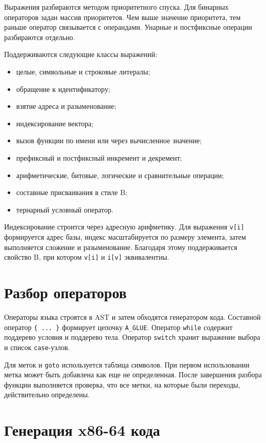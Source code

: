 Выражения разбираются методом приоритетного спуска. Для бинарных операторов задан массив приоритетов. Чем выше значение приоритета, тем раньше оператор связывается с операндами. Унарные и постфиксные операции разбираются отдельно.

Поддерживаются следующие классы выражений:

\begin{itemize}
  \item целые, символьные и строковые литералы;
  \item обращение к идентификатору;
  \item взятие адреса и разыменование;
  \item индексирование вектора;
  \item вызов функции по имени или через вычисленное значение;
  \item префиксный и постфиксный инкремент и декремент;
  \item арифметические, битовые, логические и сравнительные операции;
  \item составные присваивания в стиле B;
  \item тернарный условный оператор.
\end{itemize}

Индексирование строится через адресную арифметику. Для выражения \texttt{v[i]} формируется адрес базы, индекс масштабируется по размеру элемента, затем выполняется сложение и разыменование. Благодаря этому поддерживается свойство B, при котором \texttt{v[i]} и \texttt{i[v]} эквивалентны.

\section{Разбор операторов}

Операторы языка строятся в AST и затем обходятся генератором кода. Составной оператор \texttt{\{ ... \}} формирует цепочку \texttt{A\_GLUE}. Оператор \texttt{while} содержит поддерево условия и поддерево тела. Оператор \texttt{switch} хранит выражение выбора и список \texttt{case}-узлов.

Для меток и \texttt{goto} используется таблица символов. При первом использовании метка может быть добавлена как еще не определенная. После завершения разбора функции выполняется проверка, что все метки, на которые были переходы, действительно определены.

\section{Генерация x86-64 кода}

